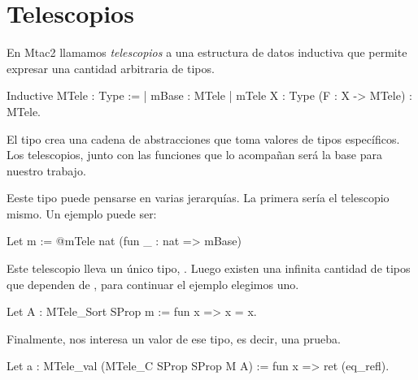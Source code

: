 \section{Telescopios}

En Mtac2 llamamos \textit{telescopios} a una estructura de datos inductiva
que permite expresar una cantidad arbitraria de tipos.

\begin{coqe}
Inductive MTele : Type :=
| mBase : MTele
| mTele {X : Type} (F : X -> MTele) : MTele.
\end{coqe}

El tipo  crea una cadena de abstracciones que toma valores de tipos
específicos.
Los telescopios, junto con las funciones que lo acompañan será la base para nuestro
trabajo.

Eeste tipo puede pensarse en varias jerarquías.
La primera sería el telescopio mismo.
Un ejemplo puede ser:

\begin{coqe}
Let m := @mTele nat (fun _ : nat => mBase)
\end{coqe}

Este telescopio lleva un único tipo, .
Luego existen una infinita cantidad de tipos que dependen de , para
continuar el ejemplo elegimos uno.

\begin{coqe}
Let A : MTele_Sort SProp m := fun x => x = x.
\end{coqe}

Finalmente, nos interesa un valor de ese tipo, es decir, una prueba.

\begin{coqe}
Let a : MTele_val (MTele_C SProp SProp M A) := fun x => ret (eq_refl).
\end{coqe}
